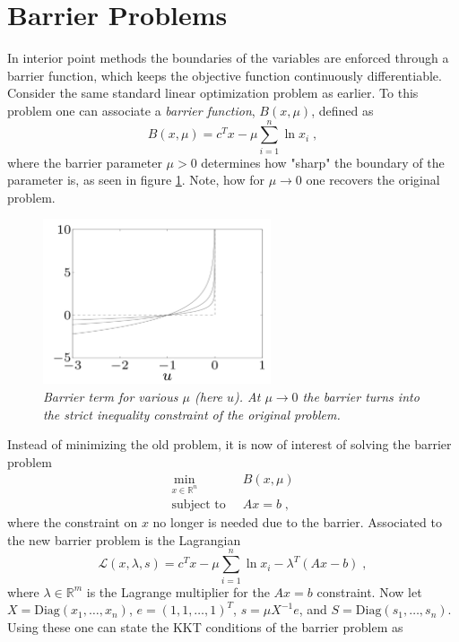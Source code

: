 \section{Barrier Problems}
In interior point methods the boundaries of the variables are enforced through a barrier function, which keeps the objective function continuously differentiable.
Consider the same standard linear optimization problem as earlier. To this problem one can associate a \textit{barrier function}, $B(x , \mu)$, defined as
\begin{equation}
	B(x , \mu) = c^T x - \mu \sum_{i=1}^{n} \ln x_i \; ,
\end{equation} 
where the barrier parameter $\mu > 0$ determines how "sharp" the boundary of the parameter is, as seen in figure \ref{fig:barrier}. Note, how for $\mu \to 0$ one recovers the original problem.
\begin{figure}[h!]
	\centering
	\includegraphics[width=0.6\textwidth]{Figures/barrier.png}
	\caption{\textit{Barrier term for various $\mu$ (here $u$). At $\mu \to 0$ the barrier turns into the strict inequality constraint of the original problem.}}
	\label{fig:barrier}
\end{figure}
Instead of minimizing the old problem, it is now of interest of solving the barrier problem 
\begin{align*}
	\min_{x \in \mathbb{R}^n} \;  & \; B(x , \mu) \\
	\text{subject to} \;  & \; A x = b   \; ,
\end{align*}
where the constraint on $x$ no longer is needed due to the barrier. Associated to the new barrier problem is the Lagrangian
\begin{equation}
	\mathcal{L}(x, \lambda, s) = c^T x - \mu \sum_{i=1}^{n} \ln x_i - \lambda^T (A x -b) \; ,
\end{equation}
where $\lambda \in \mathbb{R}^m$ is the Lagrange multiplier for the $A x = b$ constraint. Now let $X = \mathrm{Diag}(x_1 , \ldots , x_n)$, $e = (1,1, \ldots , 1)^T$, $s = \mu X^{-1} e$, and $S = \mathrm{Diag}(s_1 , \ldots , s_n)$. Using these one can state the KKT conditions of the barrier problem as 
